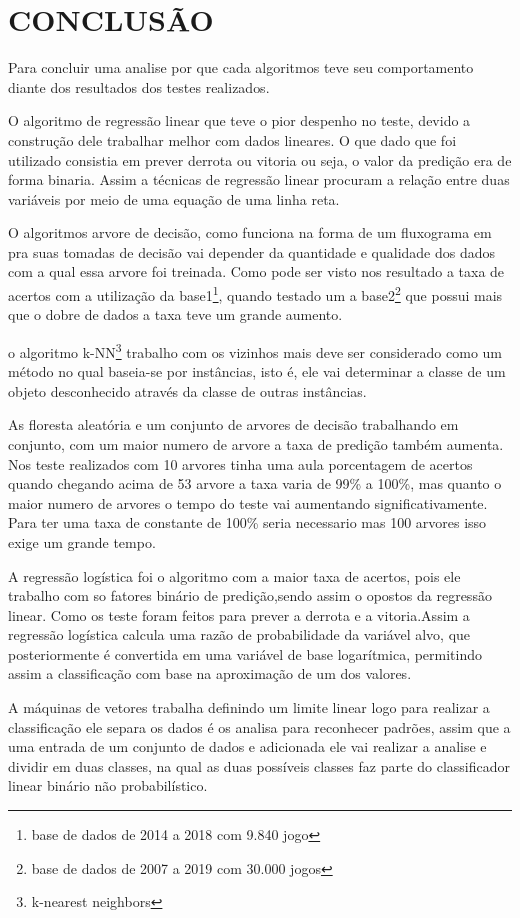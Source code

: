 \newpage
\section{CONCLUSÃO}
Para concluir uma analise por que cada algoritmos teve seu comportamento diante dos resultados dos testes realizados. 

O algoritmo de regressão linear que teve o pior despenho no teste, devido a construção dele trabalhar melhor com dados lineares. O que dado que foi utilizado consistia em prever derrota ou vitoria ou seja, o valor da predição era de forma binaria. Assim a técnicas de regressão linear procuram a relação entre duas variáveis por meio de uma equação de uma linha reta.

O algoritmos arvore de decisão, como funciona na forma de um fluxograma em pra suas tomadas de decisão vai depender da quantidade e qualidade dos dados com a qual essa arvore foi treinada. Como pode ser visto nos resultado a taxa de acertos com a utilização da base1\footnote[4]{base de dados de 2014 a 2018 com 9.840 jogo}, quando testado um a base2\footnote[5]{base de dados de 2007 a 2019 com 30.000 jogos} que possui mais que o dobre de dados a taxa teve um grande aumento.

o algoritmo k-NN\footnote[3]{k-nearest neighbors} trabalho com os vizinhos mais deve ser considerado como um método
no qual baseia-se por instâncias, isto é, ele vai determinar a classe de um objeto
desconhecido através da classe de outras instâncias.

As floresta aleatória e um conjunto de arvores de decisão trabalhando em conjunto, com um maior numero de arvore a taxa de predição também aumenta. Nos teste realizados com 10 arvores tinha uma aula porcentagem de acertos quando chegando acima de 53 arvore a taxa varia de 99\% a 100\%, mas quanto o maior numero de arvores o tempo do teste vai aumentando significativamente. Para ter uma taxa de constante de 100\% seria necessario mas 100 arvores isso exige um grande tempo.

A regressão logística foi o algoritmo com a maior taxa de acertos, pois ele trabalho com so fatores binário de predição,sendo assim o opostos da regressão linear. Como os teste foram feitos para prever a derrota e a vitoria.Assim a regressão logística calcula uma razão de probabilidade da variável alvo, que posteriormente é convertida em uma variável de base logarítmica, permitindo assim a classificação com base na aproximação de um dos valores. 

A máquinas de vetores trabalha definindo um limite linear logo para realizar a
classificação ele separa os dados é os analisa para reconhecer padrões, assim que a uma entrada de um conjunto de dados e adicionada ele vai realizar a analise e dividir em duas classes, na qual as duas possíveis classes faz parte do classificador linear binário não probabilístico.





